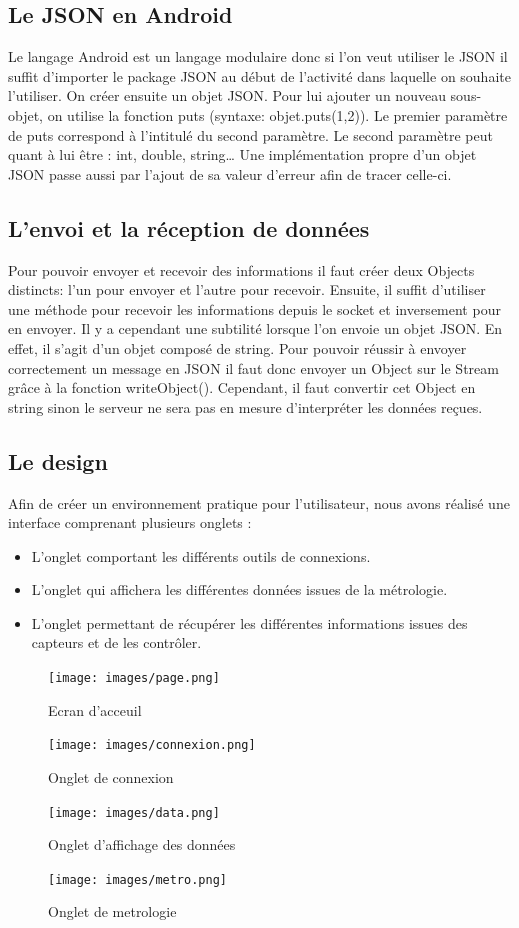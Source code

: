 \documentclass[a4paper,10pt]{article}
\begin{document}
\subsection{Le JSON en Android}
Le langage Android est un langage modulaire donc si l'on veut utiliser le JSON il suffit d’importer le package JSON au début de l’activité dans laquelle on souhaite l’utiliser. On créer ensuite un objet JSON. Pour lui ajouter un nouveau sous-objet, on utilise la fonction puts (syntaxe: objet.puts(1,2)). Le premier paramètre de puts correspond à l’intitulé du second paramètre. Le second paramètre peut quant à lui être : int, double, string… Une implémentation propre d’un objet JSON passe aussi par l’ajout de sa valeur d’erreur afin de tracer celle-ci.
\subsection{L’envoi et la réception de données}
Pour pouvoir envoyer et recevoir des informations il faut créer deux Objects distincts: l’un pour envoyer et l’autre pour recevoir. Ensuite, il suffit d’utiliser une méthode pour recevoir les informations depuis le socket et inversement pour en envoyer. Il y a cependant une subtilité lorsque l’on envoie un objet JSON. En effet, il s’agit d’un objet composé de string. Pour pouvoir réussir à envoyer correctement un message en JSON il faut donc envoyer un Object sur le Stream grâce à la fonction writeObject(). Cependant, il faut convertir cet Object en string sinon le serveur ne sera pas en mesure d’interpréter les données reçues.
\subsection{Le design} 
Afin de créer un environnement pratique pour l’utilisateur, nous avons réalisé une interface comprenant plusieurs onglets :
\begin{itemize}
	\item L’onglet comportant les différents outils de connexions.
	\item L’onglet qui affichera les différentes données issues de la métrologie.
	\item L’onglet permettant de récupérer les différentes informations issues des capteurs et de les contrôler.
\end{itemize}
\begin{figure}[H]
\centering\texttt{[image: images/page.png]}
\caption{Ecran d'acceuil}
\end{figure}
\begin{figure}[H]
\centering\texttt{[image: images/connexion.png]}
\caption{Onglet de connexion}
\end{figure}
\begin{figure}[H]
\centering\texttt{[image: images/data.png]}
\caption{Onglet d'affichage des données}
\end{figure}
\begin{figure}[H]
\centering\texttt{[image: images/metro.png]}
\caption{Onglet de metrologie}
\end{figure}
\end{document}
